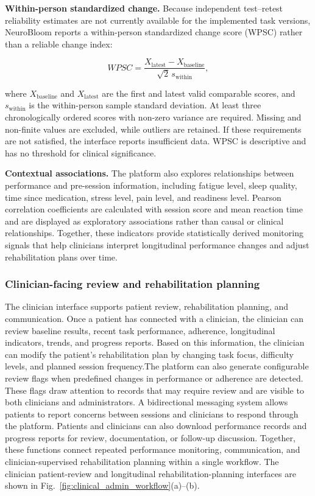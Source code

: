 \documentclass[preprint,12pt,a4paper]{elsarticle}
\begin{document}
\textbf{Within-person standardized change.}
Because independent test--retest reliability estimates are not currently
available for the implemented task versions, NeuroBloom reports a
within-person standardized change score (WPSC) rather than a reliable
change index:

\begin{equation}
WPSC =
\frac{X_{\mathrm{latest}} - X_{\mathrm{baseline}}}
{\sqrt{2}\,s_{\mathrm{within}}},
\end{equation}

where $X_{\mathrm{baseline}}$ and $X_{\mathrm{latest}}$ are the first and
latest valid comparable scores, and $s_{\mathrm{within}}$ is the
within-person sample standard deviation. At least three chronologically
ordered scores with non-zero variance are required. Missing and non-finite
values are excluded, while outliers are retained. If these requirements are
not satisfied, the interface reports insufficient data. WPSC is descriptive
and has no threshold for clinical significance.

\textbf{Contextual associations.}
The platform also explores relationships between performance and
pre-session information, including fatigue level, sleep quality, time since
medication, stress level, pain level, and readiness level. Pearson
correlation coefficients are calculated with session score and mean reaction
time and are displayed as exploratory associations rather than causal or
clinical relationships.  Together, these indicators provide statistically
derived monitoring signals that help clinicians interpret longitudinal performance changes and
adjust rehabilitation plans over time.

\subsubsection{Clinician-facing review and rehabilitation planning}

The clinician interface supports patient review, rehabilitation planning,
and communication. Once a patient has connected with a clinician, the
clinician can review baseline results, recent task performance, adherence,
longitudinal indicators, trends, and progress reports. Based on this
information, the clinician can modify the patient's rehabilitation plan by
changing task focus, difficulty levels, and planned session frequency.The platform can also generate configurable review flags when predefined
changes in performance or adherence are detected. These flags draw attention
to records that may require review and are visible to both clinicians and
administrators. A bidirectional messaging system allows patients to report concerns between
sessions and clinicians to respond through the platform. Patients and
clinicians can also download performance records and progress reports for
review, documentation, or follow-up discussion. Together, these functions
connect repeated performance monitoring, communication, and
clinician-supervised rehabilitation planning within a single workflow. The
clinician patient-review and longitudinal rehabilitation-planning
interfaces are shown in Fig.~\ref{fig:clinical_admin_workflow}(a)--(b).
\end{document}
